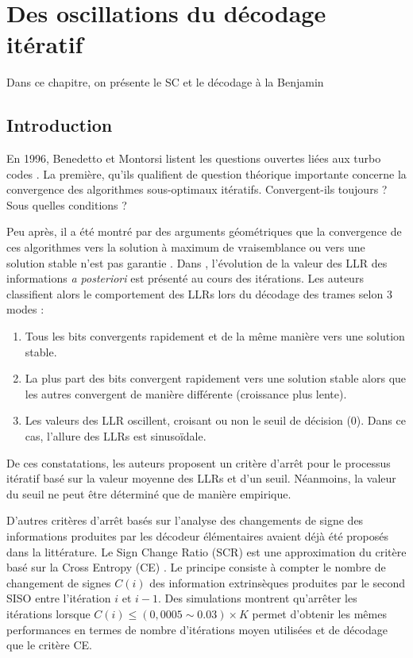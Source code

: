 \chapter{Des oscillations du décodage itératif} %

Dans ce chapitre, on présente le SC et le décodage  à la Benjamin

\vspace*{\fill}
\minitocTITI
\vspace*{\fill}
\newpage

\section{Introduction}\label{sec:ch2_intro} 
En 1996, Benedetto et Montorsi listent les questions ouvertes liées aux turbo codes \cite{benedetto_unveiling}. La
première, qu'ils qualifient de \og question théorique importante \fg concerne la convergence des algorithmes 
sous-optimaux itératifs. \og Convergent-ils toujours ? Sous quelles conditions ? \fg

Peu après, il a été montré par des arguments géométriques que la convergence de ces algorithmes vers la solution à 
maximum de vraisemblance ou vers une solution stable n'est pas garantie \cite{richardson_geometry}.
Dans \cite{reid_convergence}, l'évolution de la valeur des LLR des informations \textit{a posteriori} est présenté au 
cours des itérations. Les auteurs classifient alors le comportement des LLRs lors du décodage des trames selon 3 modes : 
\begin{enumerate}
	\item Tous les bits convergents rapidement et de la même manière vers une solution stable.
	\item La plus part des bits convergent rapidement vers une solution stable alors que les autres convergent de manière 
	différente (croissance plus lente).
	\item Les valeurs des LLR oscillent, croisant ou non le seuil de décision (0). Dans ce cas, l'allure des LLRs est 
	sinusoïdale.
\end{enumerate}
De ces constatations, les auteurs proposent un critère d'arrêt pour le processus itératif basé sur la valeur moyenne des 
LLRs et d'un seuil. Néanmoins, la valeur du seuil ne peut être déterminé que de manière empirique. %

D'autres critères d'arrêt basés sur l'analyse des changements de signe des informations produites par les décodeur 
élémentaires avaient déjà été proposés dans la littérature. Le Sign Change Ratio (SCR) \cite{fossorier_scr} est une 
approximation du critère basé sur la Cross Entropy (CE) \cite{hagenauer_ce}. Le principe consiste à compter le nombre de 
changement de signes $C(i)$ des information extrinsèques produites par le second SISO entre l'itération $i$ et $i-1$. 
Des simulations montrent qu'arrêter les itérations lorsque $C(i)\leq (0,0005 \sim 0.03)\times K$ permet d'obtenir les 
mêmes performances en termes de nombre d'itérations moyen utilisées et de décodage que le critère CE.

